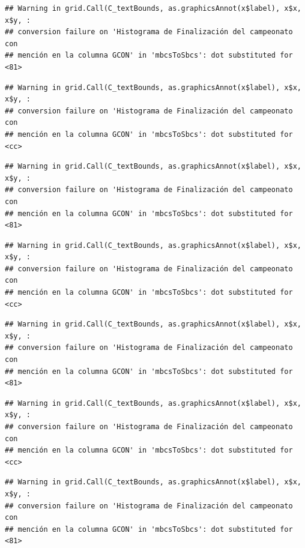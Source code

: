 \documentclass[]{article}
\begin{document}
\begin{verbatim}
## Warning in grid.Call(C_textBounds, as.graphicsAnnot(x$label), x$x, x$y, :
## conversion failure on 'Histograma de Finalización del campeonato con
## mención en la columna GCON' in 'mbcsToSbcs': dot substituted for <81>
\end{verbatim}

\begin{verbatim}
## Warning in grid.Call(C_textBounds, as.graphicsAnnot(x$label), x$x, x$y, :
## conversion failure on 'Histograma de Finalización del campeonato con
## mención en la columna GCON' in 'mbcsToSbcs': dot substituted for <cc>
\end{verbatim}

\begin{verbatim}
## Warning in grid.Call(C_textBounds, as.graphicsAnnot(x$label), x$x, x$y, :
## conversion failure on 'Histograma de Finalización del campeonato con
## mención en la columna GCON' in 'mbcsToSbcs': dot substituted for <81>
\end{verbatim}

\begin{verbatim}
## Warning in grid.Call(C_textBounds, as.graphicsAnnot(x$label), x$x, x$y, :
## conversion failure on 'Histograma de Finalización del campeonato con
## mención en la columna GCON' in 'mbcsToSbcs': dot substituted for <cc>
\end{verbatim}

\begin{verbatim}
## Warning in grid.Call(C_textBounds, as.graphicsAnnot(x$label), x$x, x$y, :
## conversion failure on 'Histograma de Finalización del campeonato con
## mención en la columna GCON' in 'mbcsToSbcs': dot substituted for <81>
\end{verbatim}

\begin{verbatim}
## Warning in grid.Call(C_textBounds, as.graphicsAnnot(x$label), x$x, x$y, :
## conversion failure on 'Histograma de Finalización del campeonato con
## mención en la columna GCON' in 'mbcsToSbcs': dot substituted for <cc>
\end{verbatim}

\begin{verbatim}
## Warning in grid.Call(C_textBounds, as.graphicsAnnot(x$label), x$x, x$y, :
## conversion failure on 'Histograma de Finalización del campeonato con
## mención en la columna GCON' in 'mbcsToSbcs': dot substituted for <81>
\end{verbatim}
\end{document}
